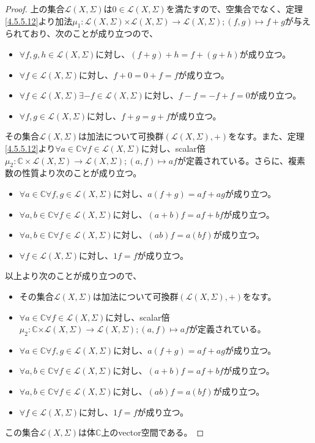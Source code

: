 \documentclass[dvipdfmx]{jsarticle}
\begin{document}
\begin{proof}
上の集合$\mathcal{L}(X,\varSigma)$は$0 \in \mathcal{L}(X,\varSigma)$を満たすので、空集合でなく、定理\ref{4.5.5.12}より加法$\mu_{1}\mathcal{:L}(X,\varSigma)\mathcal{\times L}(X,\varSigma)\mathcal{\rightarrow L}(X,\varSigma);(f,g) \mapsto f + g$が与えられており、次のことが成り立つので、
\begin{itemize}
\item
  $\forall f,g,h \in \mathcal{L}(X,\varSigma)$に対し、$(f + g) + h = f + (g + h)$が成り立つ。
\item
  $\forall f\in \mathcal{L}(X,\varSigma)$に対し、$f + 0 = 0 + f = f$が成り立つ。
\item
  $\forall f\in \mathcal{L}(X,\varSigma)\exists - f\in \mathcal{L}(X,\varSigma)$に対し、$f - f = - f + f = 0$が成り立つ。
\item
  $\forall f,g\in \mathcal{L}(X,\varSigma)$に対し、$f + g = g + f$が成り立つ。
\end{itemize}
その集合$\mathcal{L}(X,\varSigma)$は加法について可換群$\left( \mathcal{L}(X,\varSigma), + \right)$をなす。また、定理\ref{4.5.5.12}より$\forall a \in \mathbb{C}\forall f\in \mathcal{L}(X,\varSigma)$に対し、scalar倍$\mu_{2}:\mathbb{C} \times \mathcal{L}(X,\varSigma)\mathcal{\rightarrow L}(X,\varSigma);(a,f) \mapsto af$が定義されている。さらに、複素数の性質より次のことが成り立つ。
\begin{itemize}
\item
  $\forall a \in \mathbb{C}\forall f,g\in \mathcal{L}(X,\varSigma)$に対し、$a(f + g) = af + ag$が成り立つ。
\item
  $\forall a,b \in \mathbb{C}\forall f\in \mathcal{L}(X,\varSigma)$に対し、$(a + b)f = af + bf$が成り立つ。
\item
  $\forall a,b \in \mathbb{C}\forall f\in \mathcal{L}(X,\varSigma)$に対し、$(ab)f = a(bf)$が成り立つ。
\item
  $\forall f\in \mathcal{L}(X,\varSigma)$に対し、$1f = f$が成り立つ。
\end{itemize}
以上より次のことが成り立つので、
\begin{itemize}
\item
  その集合$\mathcal{L}(X,\varSigma)$は加法について可換群$\left( \mathcal{L}(X,\varSigma), + \right)$をなす。
\item
  $\forall a \in \mathbb{C}\forall f\in \mathcal{L}(X,\varSigma)$に対し、scalar倍$\mu_{2}:\mathbb{C}\mathcal{\times L}(X,\varSigma)\mathcal{\rightarrow L}(X,\varSigma);(a,f) \mapsto af$が定義されている。
\item
  $\forall a \in \mathbb{C}\forall f,g\in \mathcal{L}(X,\varSigma)$に対し、$a(f + g) = af + ag$が成り立つ。
\item
  $\forall a,b \in \mathbb{C}\forall f\in \mathcal{L}(X,\varSigma)$に対し、$(a + b)f = af + bf$が成り立つ。
\item
  $\forall a,b \in \mathbb{C}\forall f\in \mathcal{L}(X,\varSigma)$に対し、$(ab)f = a(bf)$が成り立つ。
\item
  $\forall f\in \mathcal{L}(X,\varSigma)$に対し、$1f = f$が成り立つ。
\end{itemize}
この集合$\mathcal{L}(X,\varSigma)$は体$\mathbb{C}$上のvector空間である。
\end{proof}
\end{document}
